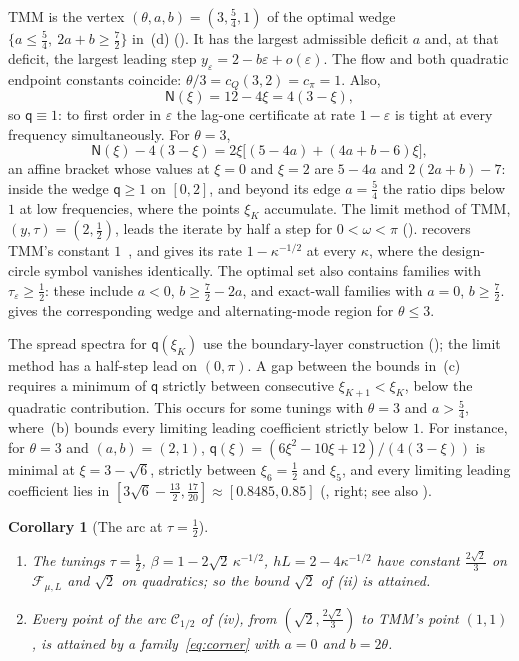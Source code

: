 \documentclass[11pt]{article}
\newtheorem{corollary}[theorem]{Corollary}
\theoremstyle{definition}
\theoremstyle{remark}
\newcommand{\cF}{\mathcal F}
\newcommand{\cQ}{c_{Q}}
\newcommand{\cpi}{c_{\pi}}
\begin{document}
TMM is the vertex \((\theta,a,b)=(3,\frac54,1)\) of the optimal wedge
\(\{a\le\frac54,\ 2a+b\ge\frac72\}\) in~(d) ().
It has the largest admissible deficit \(a\) and, at that deficit, the largest leading step
\(y_\varepsilon=2-b\varepsilon+o(\varepsilon)\).
The flow and both quadratic endpoint constants coincide:
\(\theta/3=\cQ(3,2)=\cpi=1\).  Also,
\[
\mathsf N(\xi)=12-4\xi=4(3-\xi),
\]
so \(\mathsf q\equiv1\): to first order in \(\varepsilon\) the lag-one
certificate at rate \(1-\varepsilon\) is tight at every frequency simultaneously.
For \(\theta=3\),
\[
\mathsf N(\xi)-4(3-\xi)=2\xi\bigl[(5-4a)+(4a+b-6)\xi\bigr],
\]
an affine bracket whose values at \(\xi=0\) and \(\xi=2\) are \(5-4a\) and \(2(2a+b)-7\): inside the wedge
\(\mathsf q\ge1\) on \([0,2]\), and beyond its edge \(a=\frac54\) the ratio dips below \(1\) at low frequencies, where the points \(\xi_K\) accumulate.  The limit method of TMM, \((y,\tau)=(2,\frac12)\),
leads the iterate by half a step for \(0<\omega<\pi\) ().
 recovers TMM's constant \(1\)~\cite{VFL18}, and 
gives its rate \(1-\kappa^{-1/2}\) at every \(\kappa\), where the design-circle symbol vanishes identically.  The optimal set also contains families with \(\tau_\varepsilon\ge\frac12\):
these include \(a<0\), \(b\ge\frac72-2a\), and exact-wall families with
\(a=0\), \(b\ge\frac72\).
 gives the corresponding wedge and alternating-mode region for \(\theta\le3\).

The spread spectra for \(\mathsf q(\xi_K)\) use the boundary-layer construction ();
the limit method has a half-step lead on \((0,\pi)\).
A gap between the bounds in~(c) requires a minimum of \(\mathsf q\) strictly between consecutive
\(\xi_{K+1}<\xi_K\), below the quadratic contribution.  This occurs for some tunings with \(\theta=3\) and
\(a>\frac54\), where~(b) bounds every limiting leading coefficient strictly below \(1\).  For instance, for \(\theta=3\) and \((a,b)=(2,1)\),
\(\mathsf q(\xi)=(6\xi^2-10\xi+12)/(4(3-\xi))\) is minimal at \(\xi=3-\sqrt6\), strictly between \(\xi_6=\frac12\) and \(\xi_5\), and every limiting leading coefficient lies in
\([3\sqrt6-\frac{13}2,\frac{17}{20}]\approx[0.8485,0.85]\)
(, right; see also ).

\begin{corollary}[The arc at \(\tau=\frac12\)]\label{cor:arc}
\leavevmode
\begin{enumerate}[label=\textup{(\roman*)}]
\item The tunings \(\tau=\frac12\), \(\beta=1-2\sqrt2\,\kappa^{-1/2}\),
\(hL=2-4\kappa^{-1/2}\) have constant \(\frac{2\sqrt2}3\) on \(\cF_{\mu,L}\) and \(\sqrt2\) on quadratics; so the bound \(\sqrt2\) of
(ii) is attained.
\item Every point of the arc \(\mathcal C_{1/2}\) of (iv), from \((\sqrt2,\frac{2\sqrt2}3)\) to TMM's point \((1,1)\), is
attained by a family~\eqref{eq:corner} with \(a=0\) and \(b=2\theta\).
\end{enumerate}
\end{corollary}
\end{document}
